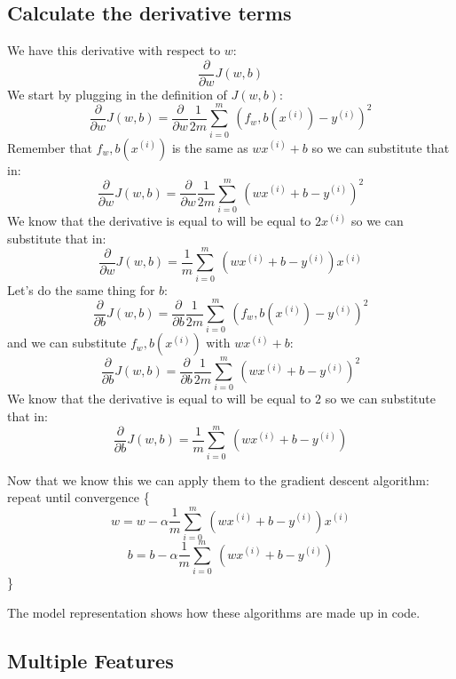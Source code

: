 \subsection{Calculate the derivative terms}

We have this derivative with respect to $w$:
$$ \frac{\partial}{\partial w}J(w,b)$$
We start by plugging in the definition of $J(w,b)$:
$$ \frac{\partial}{\partial w}J(w,b)=\frac{\partial}{\partial w}\frac{1}{2m}\sum_{i=0}^{m}\ (f_w,b(x^{(i)})-y^{(i)})^2$$
Remember that $f_w,b(x^{(i)})$ is the same as $wx^{(i)}+b$ so we can substitute that in:
$$ \frac{\partial}{\partial w}J(w,b)=\frac{\partial}{\partial w}\frac{1}{2m}\sum_{i=0}^{m}\ (wx^{(i)}+b-y^{(i)})^2$$
We know that the derivative is equal to will be equal to $2x^{(i)}$ so we can substitute that in:
$$ \frac{\partial}{\partial w}J(w,b)=\frac{1}{m}\sum_{i=0}^{m}\ (wx^{(i)}+b-y^{(i)})x^{(i)}$$
Let's do the same thing for $b$:
$$ \frac{\partial}{\partial b}J(w,b)=\frac{\partial}{\partial b}\frac{1}{2m}\sum_{i=0}^{m}\ (f_w,b(x^{(i)})-y^{(i)})^2$$
and we can substitute $f_w,b(x^{(i)})$ with $wx^{(i)}+b$:
$$ \frac{\partial}{\partial b}J(w,b)=\frac{\partial}{\partial b}\frac{1}{2m}\sum_{i=0}^{m}\ (wx^{(i)}+b-y^{(i)})^2$$
We know that the derivative is equal to will be equal to $2$ so we can substitute that in:
$$ \frac{\partial}{\partial b}J(w,b)=\frac{1}{m}\sum_{i=0}^{m}\ (wx^{(i)}+b-y^{(i)})$$

Now that we know this we can apply them to the gradient descent algorithm:
repeat until convergence \{
$$ w=w-\alpha \frac{1}{m}\sum_{i=0}^{m}\ (wx^{(i)}+b-y^{(i)})x^{(i)}$$
$$ b=b-\alpha \frac{1}{m}\sum_{i=0}^{m}\ (wx^{(i)}+b-y^{(i)})$$
\}

The model representation shows how these algorithms are made up in code.

\subsection{Multiple Features}

